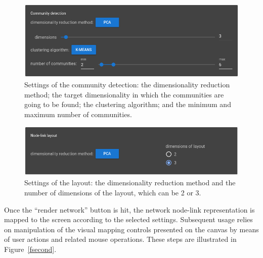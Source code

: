 \documentclass[Afour,sagev,times]{sagej}
\begin{document}
\begin{figure}\centering
 \includegraphics[width=\columnwidth]{figs/com}
  \caption{
    Settings of the community detection: the dimensionality reduction method;
    the target dimensionality in which the communities are going to be found;
    the clustering algorithm;
    and the minimum and maximum number of communities.
  }\label{fcom}
\end{figure}

\begin{figure}\centering
 \includegraphics[width=\columnwidth]{figs/lay}
  \caption{
    Settings of the layout: the dimensionality reduction method and
    the number of dimensions of the layout, which can be 2 or 3.
  }\label{flay}
\end{figure}

Once the ``render network'' button is hit, the network node-link representation is mapped to the screen according to the selected settings.
Subsequent usage relies on manipulation of the visual mapping controls presented on the
canvas by means of user actions and related mouse operations.
These steps are illustrated in Figure~\ref{fsecond}.
\end{document}
